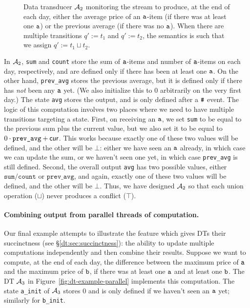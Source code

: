 \begin{figure}[t]
\caption[Data transducer example 2.]{Data transducer $\mathcal{A}_2$ monitoring the stream to produce, at the end of each day, either the average price of an $\texttt{a}$-item (if there was at least one $\texttt{a}$) or the previous average (if there was no $\texttt{a}$). When there are multiple transitions $q' := t_1$ and $q' := t_2$, the semantics is such that we assign $q' := t_1 \sqcup t_2$.}
\label{fig:dt-example-multipletransitions}
\end{figure}

In $\mathcal{A}_2$, \texttt{sum} and \texttt{count} store the sum of $\texttt{a}$-items and number of $\texttt{a}$-items on each day, respectively, and are defined only if there has been at least one $\texttt{a}$. On the other hand, \texttt{prev\_avg} stores the previous average, but it is defined only if there has \emph{not} been any $\texttt{a}$ yet. (We also initialize this to $0$ arbitrarily on the very first day.)
The state \texttt{avg} stores the output, and is only defined after a $\texttt{\#}$ event. The logic of this computation involves two places where we need to have multiple transitions targeting a state. First, on receiving an $\texttt{a}$, we set \texttt{sum} to be equal to the previous sum plus the current value, but we also set it to be equal to $0 \cdot \texttt{prev\_avg} + \mathsf{cur}$. This works because exactly one of these two values will be defined, and the other will be $\bot$: either we have seen an $\texttt{a}$ already, in which case we can update the sum, or we haven't seen one yet, in which case \texttt{prev\_avg} is still defined. Second, the overall output \texttt{avg} has two possible values, either $\texttt{sum} / \texttt{count}$ or $\texttt{prev\_avg}$, and again, exactly one of these two values will be defined, and the other will be $\bot$.
Thus, we have designed $\mathcal{A}_2$ so that each union operation ($\sqcup$) never produces a conflict ($\top$).

\paragraph*{Combining output from parallel threads of computation.}
Our final example attempts to illustrate the feature which gives DTs their succinctness (see \S\ref{dt:sec:succinctness}): the ability to update multiple computations independently and then combine their results. Suppose we want to compute, at the end of each day, the difference between the maximum price of $\texttt{a}$ and the maximum price of $\texttt{b}$, if there was at least one $\texttt{a}$ and at least one $\texttt{b}$. The DT $\mathcal{A}_3$ in Figure~\ref{fig:dt-example-parallel} implements this computation.
The state \texttt{a\_init} of $\mathcal{A}_3$ stores $0$ and is only defined if we haven't seen an $\texttt{a}$ yet; similarly for \texttt{b\_init}.

